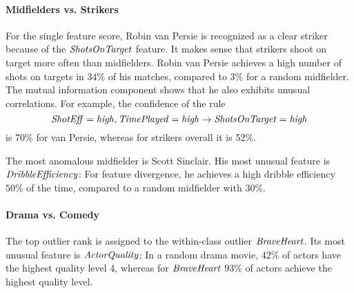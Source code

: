 {							\paragraph{Midfielders vs. Strikers} 
							
							For the single feature score, Robin van Persie is recognized as a clear striker because of the $\it{ShotsOnTarget}$ feature. It makes sense that strikers shoot on target more often than midfielders. Robin van Persie  achieves a high number of shots on targets in $34\%$ of his matches, compared to $3\%$ for a random midfielder. The mutual information component shows that he also exhibits  unusual correlations. For example, 
							the confidence of the rule
							$$\it{ShotEff} = \it{high}, \it{TimePlayed} = \it{high} \rightarrow \it{ShotsOnTarget} = \it{high}$$
							is 70\% for van Persie, whereas for strikers overall it is 52\%.
							
							The most anomalous midfielder is Scott Sinclair. His most unusual feature is $\it{DribbleEfficiency}$: For feature divergence, he achieves a high dribble efficiency $50\%$ of the time, compared to a random midfielder with $30\%$. 
							\paragraph{Drama vs. Comedy} 
							The top outlier rank is assigned to the within-class outlier $\it{Brave Heart}$. Its most  unusual feature is  $\it{ActorQuality}$: In a random drama movie,  $42\%$ of actors have the highest quality level 4, whereas for $\it{Brave Heart}$ $93\%$ of actors achieve the highest quality level. 
						
}
